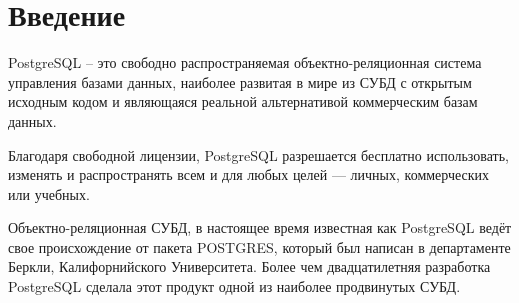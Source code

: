\section*{Введение}\label{sec:introduction}

PostgreSQL -- это свободно распространяемая объектно-реляционная система управления базами данных, наиболее развитая в мире из СУБД с открытым исходным кодом и являющаяся реальной альтернативой коммерческим базам данных.

Благодаря свободной лицензии, PostgreSQL разрешается бесплатно использовать, изменять и распространять всем и для любых целей — личных, коммерческих или учебных.

Объектно-реляционная СУБД, в настоящее время известная как PostgreSQL ведёт свое происхождение от пакета POSTGRES, который был написан в департаменте Беркли, Калифорнийского Университета. Более чем двадцатилетняя разработка PostgreSQL сделала этот продукт одной из наиболее продвинутых СУБД.\cite{postgrespro}

\newpage